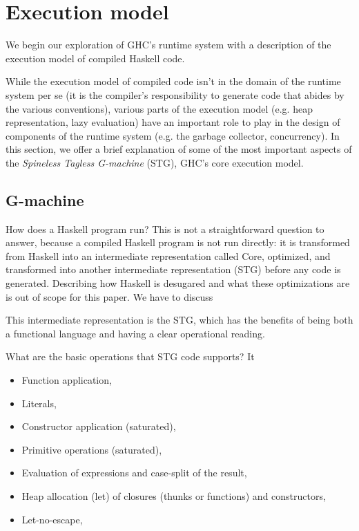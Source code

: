 \section{Execution model}

We begin our exploration of GHC's runtime system with a description
of the execution model of compiled Haskell code.

While the execution model of compiled code isn't in the domain of the
runtime system per se (it is the compiler's responsibility to generate
code that abides by the various conventions), various parts of the
execution model (e.g. heap representation, lazy evaluation) have an
important role to play in the design of components of the runtime system
(e.g. the garbage collector, concurrency).  In this section, we offer a
brief explanation of some of the most important aspects of the
\emph{Spineless Tagless G-machine} (STG), GHC's core execution model.

\subsection{G-machine}

How does a Haskell program run?  This is not a straightforward question
to answer, because a compiled Haskell program is not run directly: it is
transformed from Haskell into an intermediate representation called
Core, optimized, and transformed into another intermediate
representation (STG) before any code is generated.  Describing how
Haskell is desugared and what these optimizations are is out of scope
for this paper.  We have to discuss 

This intermediate representation is the STG, which has the benefits of
being both a functional language and having a clear operational reading.

What are the basic operations that STG code supports?  It 

\begin{itemize}
    \item Function application,
    \item Literals,
    \item Constructor application (saturated),
    \item Primitive operations (saturated),
    \item Evaluation of expressions and case-split of the result,
    \item Heap allocation (let) of closures (thunks or functions) and constructors,
    \item Let-no-escape,
\end{itemize}


